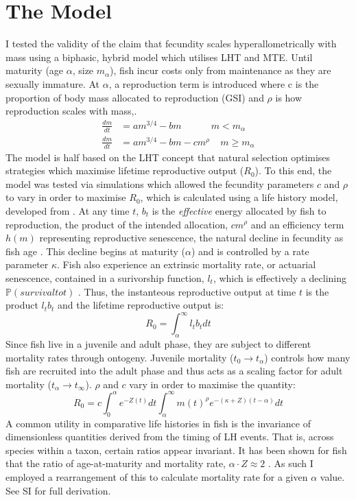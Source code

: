 \documentclass[a4paper]{article} %
\begin{document}
\section{The Model}\thispagestyle{empty}
I tested the validity of the claim that fecundity scales hyperallometrically with mass using a biphasic, hybrid model which utilises LHT and MTE. Until maturity (age $\alpha$, size $m_{\alpha}$), fish incur costs only from maintenance as they are sexually immature. At $\alpha$, a reproduction term is introduced where c is the proportion of body mass allocated to reproduction (GSI) and $\rho$ is how reproduction scales with mass,.
\begin{align*}
    \frac{dm}{dt} &= am^{3/4} - bm \ \ \ \ \ \ \ \ \ \ \ \ \ \ m < m_{\alpha} \\
    \frac{dm}{dt} &= am^{3/4} - bm - cm^{\rho} \ \ \ \ \ m \geq m_{\alpha}
\end{align*}
The model is half based on the LHT concept that natural selection optimises strategies which maximise lifetime reproductive output ($R_0$). To this end, the model was tested via simulations which allowed the fecundity parameters $c$ and $\rho$ to vary in order to maximise $R_0$, which is calculated using a life history model, developed from \cite{Charnov2001}. At any time $t$, $b_{t}$ is the \textit{effective} energy allocated by fish to reproduction, the product of the intended allocation, $cm^{\rho}$ and an efficiency term $h(m)$ representing reproductive senescence, the natural decline in fecundity as fish age \autocite{Benoit2018, Vrtilek2018}. This decline begins at maturity ($\alpha$) and is controlled by a rate parameter $\kappa$. Fish also experience an extrinsic mortality rate, or actuarial senescence, contained in a surivorship function, $l_t$, which is effectively a declining $\mathbb{P}(survival to t)$ \autocite{Benoit2018, Laird2010, Reznick2002, Reznick2006}. Thus, the instanteous reproductive output at time $t$ is the product $l_{t}b_{t}$ and the lifetime reproductive output is:
\begin{equation}
    R_{0} = \int_{\alpha}^{\infty}l_{t}b_{t} dt
\end{equation}
Since fish live in a juvenile and adult phase, they are subject to different mortality rates through ontogeny. Juvenile mortality ($t_0 \rightarrow t_{\alpha}$) controls how many fish are recruited into the adult phase and thus acts as a scaling factor for adult mortality ($t_{\alpha} \rightarrow t_{\infty}$). $\rho$ and $c$ vary in order to maximise the quantity:
\begin{equation}
    R_{0} = c\int_{0}^{\alpha}e^{-Z(t)}dt\int_{\alpha}^{\infty} m(t)^{\rho} e^{-(\kappa+Z)(t-\alpha)} dt
\end{equation}
A common utility in comparative life histories in fish is the invariance of dimensionless quantities derived from the timing of LH events. That is, across species within a taxon, certain ratios appear invariant. It has been shown for fish that the ratio of age-at-maturity and mortality rate, $\alpha\cdot Z \approx 2$ \autocite{charnov1993}. As such I employed a rearrangement of this to calculate mortality rate for a given $\alpha$ value.
See SI for full derivation.
\end{document}
